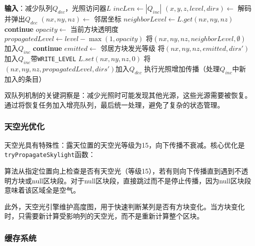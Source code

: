 \begin{algorithm}
\caption{光照减少传播算法}
\begin{algorithmic}[1]
\STATE \textbf{输入}：减少队列$Q_{dec}$，光照访问器$L$
\STATE $incLen \gets |Q_{inc}|$ 
    \STATE $(x, y, z, level, dirs) \gets$ 解码并弹出$Q_{dec}$
        \STATE $(nx, ny, nz) \gets$ 邻居坐标
        \STATE $neighborLevel \gets L.get(nx, ny, nz)$
            \STATE \textbf{continue}
        \ENDIF
        \STATE $opacity \gets$ 当前方块透明度
        \STATE $propagatedLevel \gets level - \max(1, opacity)$
            \STATE {}
            \STATE 将$(nx, ny, nz, neighborLevel, \emptyset)$加入$Q_{inc}$
            \STATE \textbf{continue}
        \ENDIF
        \STATE $emitted \gets$ 邻居方块发光等级
            \STATE 将$(nx, ny, nz, emitted, dirs')$加入$Q_{inc}$带\texttt{WRITE\_LEVEL}
        \ENDIF
        \STATE $L.set(nx, ny, nz, 0)$ 
            \STATE 将$(nx, ny, nz, propagatedLevel, dirs')$加入$Q_{dec}$
        \ENDIF
    \ENDFOR
\ENDWHILE
\STATE 执行光照增加传播（处理$Q_{inc}$中新加入的条目）
\end{algorithmic}
\end{algorithm}

双队列机制的关键洞察是：减少光照时可能发现其他光源，这些光源需要被恢复。通过将恢复任务加入增亮队列，最后统一处理，避免了复杂的状态管理。

\subsubsection{天空光优化}

天空光具有特殊性：露天位置的天空光等级为15，向下传播不衰减。核心优化是\texttt{tryPropagateSkylight}函数：

算法从指定位置向上检查是否有天空光（等级15），若有则向下传播直到遇到不透明方块或null区块段。对于null区块段，直接跳过而不是停止传播，因为null区块段意味着该区域全是空气。

此外，天空光引擎维护高度图，用于快速判断某列是否有方块变化。当方块变化时，只需要新计算受影响列的天空光，而不是重新计算整个区块。

\subsubsection{缓存系统}

